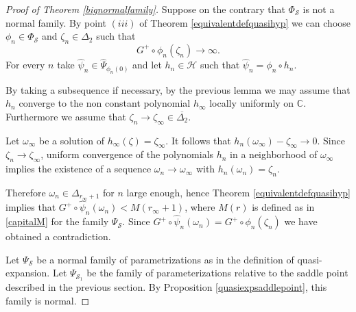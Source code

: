 \documentclass[10pt,a4paper]{article}
\begin{document}
\begin{proof}[Proof of Theorem \ref{bignormalfamily}]
Suppose on the contrary that $\Phi_\mathcal S$ is not a normal family. By point $(iii)$ of Theorem \ref{equivalentdefquasihyp} we can choose $\phi_n\in\Phi_\mathcal S$ and $\zeta_n\in\Delta_2$ such that
\[
G^+\circ\phi_n(\zeta_n)\to\infty.
\]
For every $n$ take $\widehat\psi_n\in\widehat\Psi_{\phi_n(0)}$ and let $h_n\in\mathcal H$ such that $\widehat\psi_n=\phi_n\circ h_n$.

By taking a subsequence if necessary, by the previous lemma we may assume that $h_n$ converge to the non constant polynomial $h_\infty$ locally uniformly on $\mathbb C$. Furthermore we assume that $\zeta_n\to\zeta_\infty\in\overline{\Delta_2}$.

Let $\omega_\infty$ be a solution of $h_\infty(\zeta) = \zeta_\infty$. It follows that $h_n(\omega_\infty) - \zeta_\infty \rightarrow 0$. Since $\zeta_n \rightarrow \zeta_\infty$, uniform convergence of the polynomials $h_n$ in a neighborhood of $\omega_\infty$ implies the existence of a sequence $\omega_n \rightarrow \omega_\infty$ with $h_n(\omega_n) = \zeta_n$.



Therefore $\omega_n\in\Delta_{r_\infty+1}$ for $n$ large enough, hence Theorem \ref{equivalentdefquasihyp} implies that $G^+\circ\widehat\psi_n(\omega_n)<M(r_\infty+1)$, where $M(r)$ is defined as in \eqref{capitalM} for the family $\Psi_{\mathcal S}$. Since $G^+\circ\widehat\psi_n(\omega_n)=G^+\circ\phi_n(\zeta_n)$ we have obtained a contradiction.


Let $\Psi_{\mathcal S}$ be a normal family of parametrizations as in the definition of quasi-expansion. Let $\Psi_{\mathcal S_1}$ be the family of parameterizations relative to the saddle point described in the previous section. By Proposition \ref{quasiexpsaddlepoint}, this family is normal.  %


\end{proof}
\end{document}
